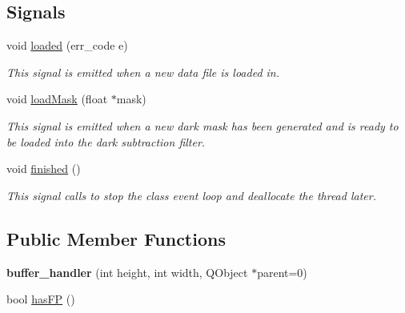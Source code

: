 \subsection*{Signals}
\begin{DoxyCompactItemize}
\item 
\hypertarget{classbuffer__handler_accc4e4bd263c96a5e12fbb853cd7fee2}{void \hyperlink{classbuffer__handler_accc4e4bd263c96a5e12fbb853cd7fee2}{loaded} (err\+\_\+code e)}\label{classbuffer__handler_accc4e4bd263c96a5e12fbb853cd7fee2}

\begin{DoxyCompactList}\small\item\em This signal is emitted when a new data file is loaded in. \end{DoxyCompactList}\item 
\hypertarget{classbuffer__handler_a67f5bfb1fe3530720805baf40b62b91e}{void \hyperlink{classbuffer__handler_a67f5bfb1fe3530720805baf40b62b91e}{load\+Mask} (float $\ast$mask)}\label{classbuffer__handler_a67f5bfb1fe3530720805baf40b62b91e}

\begin{DoxyCompactList}\small\item\em This signal is emitted when a new dark mask has been generated and is ready to be loaded into the dark subtraction filter. \end{DoxyCompactList}\item 
\hypertarget{classbuffer__handler_a16fd2e21aed6d5781475bbc05f64b65a}{void \hyperlink{classbuffer__handler_a16fd2e21aed6d5781475bbc05f64b65a}{finished} ()}\label{classbuffer__handler_a16fd2e21aed6d5781475bbc05f64b65a}

\begin{DoxyCompactList}\small\item\em This signal calls to stop the class event loop and deallocate the thread later. \end{DoxyCompactList}\end{DoxyCompactItemize}
\subsection*{Public Member Functions}
\begin{DoxyCompactItemize}
\item 
\hypertarget{classbuffer__handler_aeb99886dc23eab7a824f29720cfe1df9}{{\bfseries buffer\+\_\+handler} (int height, int width, Q\+Object $\ast$parent=0)}\label{classbuffer__handler_aeb99886dc23eab7a824f29720cfe1df9}

\item 
bool \hyperlink{classbuffer__handler_a1ffb6a45954985e0b7fc07dad61e1fc2}{has\+F\+P} ()
\end{DoxyCompactItemize}
